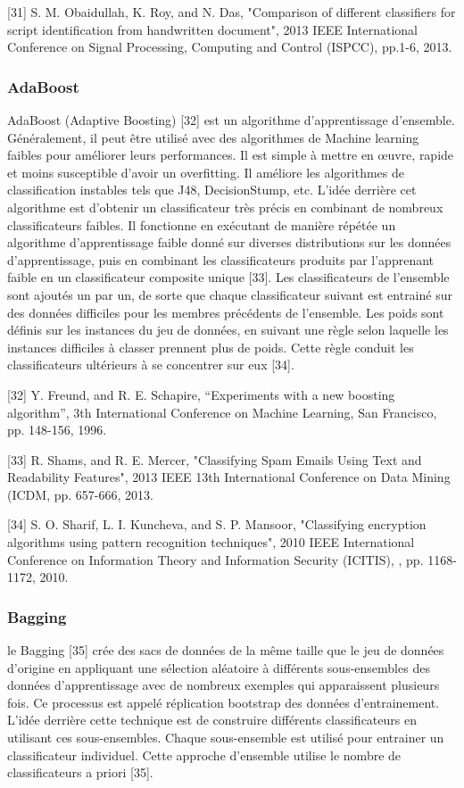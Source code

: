 [31] S. M. Obaidullah, K. Roy, and N. Das, "Comparison of different classifiers for script identification from handwritten document", 2013 IEEE International Conference on Signal Processing, Computing and Control (ISPCC), pp.1-6, 2013.

\subsubsection{AdaBoost}
AdaBoost (Adaptive Boosting) [32] est un algorithme d'apprentissage d'ensemble. Généralement, il peut être utilisé avec des algorithmes de Machine learning faibles pour améliorer leurs performances. Il est simple à mettre en œuvre, rapide et moins susceptible d'avoir un overfitting. Il améliore les algorithmes de classification instables tels que J48, DecisionStump, etc. L'idée derrière cet algorithme est d'obtenir un classificateur très précis en combinant de nombreux classificateurs faibles. Il fonctionne en exécutant de manière répétée un algorithme d'apprentissage faible donné sur diverses distributions sur les données d'apprentissage, puis en combinant les classificateurs produits par l'apprenant faible en un classificateur composite unique [33]. Les classificateurs de l'ensemble sont ajoutés un par un, de sorte que chaque classificateur suivant est entrainé sur des données difficiles pour les membres précédents de l'ensemble. Les poids sont définis sur les instances du jeu de données, en suivant une règle selon laquelle les instances difficiles à classer prennent plus de poids. Cette règle conduit les classificateurs ultérieurs à se concentrer sur eux [34].

[32] Y. Freund, and R. E. Schapire, “Experiments with a new boosting algorithm”, 3th International Conference on Machine Learning, San Francisco, pp. 148-156, 1996.

[33] R. Shams, and R. E. Mercer, "Classifying Spam Emails Using Text and Readability Features", 2013 IEEE 13th International Conference on Data Mining (ICDM, pp. 657-666, 2013.

[34] S. O. Sharif, L. I. Kuncheva, and S. P. Mansoor, "Classifying encryption algorithms using pattern recognition techniques", 2010 IEEE International Conference on Information Theory and Information Security (ICITIS), , pp. 1168-1172, 2010.

\subsubsection{Bagging}
le Bagging [35] crée des sacs de données de la même taille que le jeu de données d'origine en appliquant une sélection aléatoire à différents sous-ensembles des données d'apprentissage avec de nombreux exemples qui apparaissent plusieurs fois. Ce processus est appelé réplication bootstrap des données d'entrainement. L'idée derrière cette technique est de construire différents classificateurs en utilisant ces sous-ensembles. Chaque sous-ensemble est utilisé pour entrainer un classificateur individuel. Cette approche d'ensemble utilise le nombre de classificateurs a priori [35].


